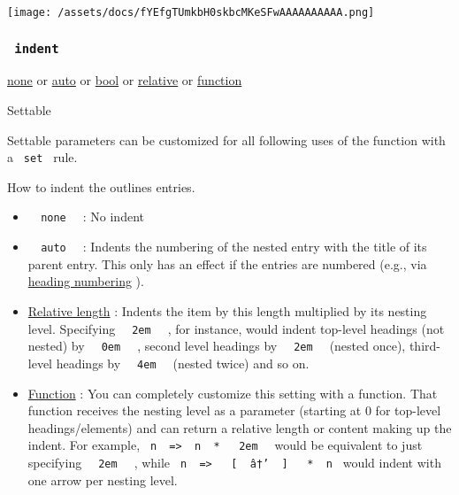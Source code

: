 \texttt{[image: /assets/docs/fYEfgTUmkbH0skbcMKeSFwAAAAAAAAAA.png]}

\subsubsection{\texorpdfstring{\texttt{\ indent\ }}{ indent }}\label{parameters-indent}

\href{/docs/reference/foundations/none/}{none} {or}
\href{/docs/reference/foundations/auto/}{auto} {or}
\href{/docs/reference/foundations/bool/}{bool} {or}
\href{/docs/reference/layout/relative/}{relative} {or}
\href{/docs/reference/foundations/function/}{function}

{{ Settable }}

\label{parameters-indent-settable-tooltip}
Settable parameters can be customized for all following uses of the
function with a \texttt{\ set\ } rule.

How to indent the outline\textquotesingle s entries.

\begin{itemize}
\tightlist
\item
  \texttt{\ }{\texttt{\ none\ }}\texttt{\ } : No indent
\item
  \texttt{\ }{\texttt{\ auto\ }}\texttt{\ } : Indents the numbering of
  the nested entry with the title of its parent entry. This only has an
  effect if the entries are numbered (e.g., via
  \href{/docs/reference/model/heading/\#parameters-numbering}{heading
  numbering} ).
\item
  \href{/docs/reference/layout/relative/}{Relative length} : Indents the
  item by this length multiplied by its nesting level. Specifying
  \texttt{\ }{\texttt{\ 2em\ }}\texttt{\ } , for instance, would indent
  top-level headings (not nested) by
  \texttt{\ }{\texttt{\ 0em\ }}\texttt{\ } , second level headings by
  \texttt{\ }{\texttt{\ 2em\ }}\texttt{\ } (nested once), third-level
  headings by \texttt{\ }{\texttt{\ 4em\ }}\texttt{\ } (nested twice)
  and so on.
\item
  \href{/docs/reference/foundations/function/}{Function} : You can
  completely customize this setting with a function. That function
  receives the nesting level as a parameter (starting at 0 for top-level
  headings/elements) and can return a relative length or content making
  up the indent. For example,
  \texttt{\ n\ }{\texttt{\ =\textgreater{}\ }}\texttt{\ n\ }{\texttt{\ *\ }}\texttt{\ }{\texttt{\ 2em\ }}\texttt{\ }
  would be equivalent to just specifying
  \texttt{\ }{\texttt{\ 2em\ }}\texttt{\ } , while
  \texttt{\ n\ }{\texttt{\ =\textgreater{}\ }}\texttt{\ }{\texttt{\ {[}\ }}\texttt{\ â†’\ }{\texttt{\ {]}\ }}\texttt{\ }{\texttt{\ *\ }}\texttt{\ n\ }
  would indent with one arrow per nesting level.
\end{itemize}

